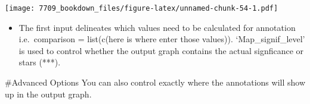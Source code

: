 \documentclass[]{book}
\newenvironment{Shaded}{\begin{snugshade}}{\end{snugshade}}
\newcommand{\DataTypeTok}[1]{\textcolor[rgb]{0.13,0.29,0.53}{#1}}
\newcommand{\DecValTok}[1]{\textcolor[rgb]{0.00,0.00,0.81}{#1}}
\newcommand{\KeywordTok}[1]{\textcolor[rgb]{0.13,0.29,0.53}{\textbf{#1}}}
\newcommand{\NormalTok}[1]{#1}
\newcommand{\OperatorTok}[1]{\textcolor[rgb]{0.81,0.36,0.00}{\textbf{#1}}}
\newcommand{\OtherTok}[1]{\textcolor[rgb]{0.56,0.35,0.01}{#1}}
\newcommand{\StringTok}[1]{\textcolor[rgb]{0.31,0.60,0.02}{#1}}
\providecommand{\tightlist}{%
  \setlength{\itemsep}{0pt}\setlength{\parskip}{0pt}}
\begin{document}
\begin{Shaded}
\end{Shaded}

\texttt{[image: 7709\_bookdown\_files/figure-latex/unnamed-chunk-54-1.pdf]}

\begin{itemize}
\tightlist
\item
  The first input delineates which values need to be calculated for annotation i.e.~comparison = list(c(here is where enter those values)). `Map\_signif\_level' is used to control whether the output graph contains the actual signficance or stars (***).
\end{itemize}

\#Advanced Options
You can also control exactly where the annotations will show up in the output graph.
\end{document}
